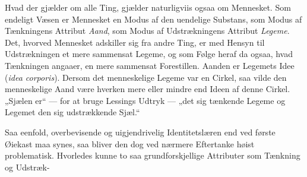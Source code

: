 \documentclass[12pt,a4paper]{book}
\begin{document}
Hvad der gjælder om alle Ting, gjælder naturligviis ogsaa om Mennesket. Som
endeligt Væsen er Mennesket en Modus af den uendelige Substans, som Modus af
Tænkningens Attribut \emph{Aand}, som Modus af Udstrækningens Attribut
\emph{Legeme}. Det, hvorved Mennesket adskiller sig fra andre Ting, er med Hensyn
til Udstrækningen et mere sammensat Legeme, og som Følge heraf da ogsaa, hvad
Tænkningen angaaer, en mere sammensat Forestillen. Aanden er Legemets Idee
(\textit{idea corporis}). Dersom det menneskelige Legeme var en Cirkel, saa vilde
den menneskelige Aand være hverken mere eller mindre end Ideen af denne Cirkel.
„Sjælen er“ --- for at bruge Lessings Udtryk --- „det sig tænkende Legeme og
Legemet den sig udstrækkende Sjæl.“

Saa eenfold, overbevisende og uigjendrivelig Identitetslæren end ved første
Øiekast maa synes, saa bliver den dog ved nærmere Eftertanke høist problematisk.
Hvorledes kunne to saa grundforskjellige Attributer som Tænkning og Udstræk-






\end{document}
